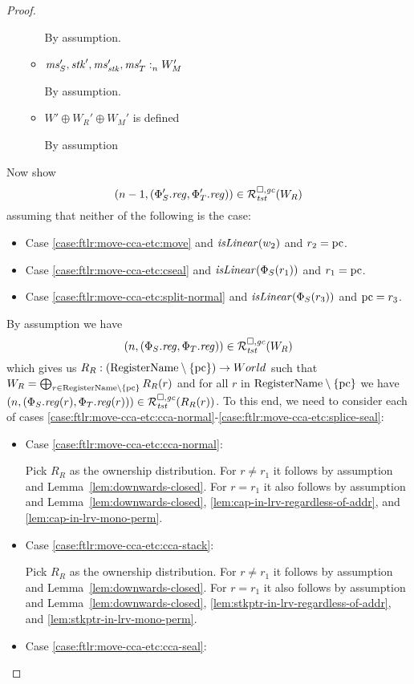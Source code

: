 \begin{proof}
\begin{itemize}
\begin{itemize}
      By assumption.
    \item $\mathit{ms}_S',\mathit{stk}',\mathit{ms}_{\mathit{stk}}',\mathit{ms}_T' :_{n}^{}W_M'$

      By assumption.

    \item $W' \oplus W_R' \oplus W_M'$ is defined

      By assumption
    \end{itemize}
  \end{itemize}
  
  Now show
  \[
    \npair[n-1]{(\Phi_S'.\reg,\Phi_T'.\reg)} \in \lrrg{\trust}(W_R)
  \]
  assuming that neither of the following is the case:
  \begin{itemize}
  \item Case \ref{case:ftlr:move-cca-etc:move} and $\isLinear{w_2}$ and $r_2 = \mathrm{pc}$.
  \item Case \ref{case:ftlr:move-cca-etc:cseal} and $\isLinear{\Phi_S(r_1)}$ and
    $r_1 = \mathrm{pc}$.
  \item Case \ref{case:ftlr:move-cca-etc:split-normal} and
    $\isLinear{\Phi_S(r_3)}$ and $\mathrm{pc} = r_3$.
  \end{itemize}

  By assumption we have
  \[
    \npair[n]{(\Phi_S.\reg,\Phi_T.\reg)} \in \lrrg{\trust}(W_R)
  \]
  which gives us $R_R : (\mathrm{RegisterName} \setminus \{\mathrm{pc}\}) \rightarrow World$ such that $W_R = \bigoplus_{r\in \mathrm{RegisterName} \setminus \{\mathrm{pc}\}} R_R(r)$ and for all $r$ in $\mathrm{RegisterName} \setminus \{\mathrm{pc}\}$ we have $\npair[n]{(\Phi_S.\reg(r),\Phi_T.\reg(r))} \in \lrrg{\trust}(R_R(r))$.
  To this end, we need to consider each of cases \ref{case:ftlr:move-cca-etc:cca-normal}-\ref{case:ftlr:move-cca-etc:splice-seal}:
  \begin{itemize}
  \item Case \ref{case:ftlr:move-cca-etc:cca-normal}:

    Pick $R_R$ as the ownership distribution.
    For $r \neq r_1$ it follows by assumption and Lemma~\ref{lem:downwards-closed}.
    For $r = r_1$ it also follows by assumption and Lemma~\ref{lem:downwards-closed}, \ref{lem:cap-in-lrv-regardless-of-addr}, and \ref{lem:cap-in-lrv-mono-perm}.
  \item Case \ref{case:ftlr:move-cca-etc:cca-stack}:

    Pick $R_R$ as the ownership distribution.
    For $r \neq r_1$ it follows by assumption and Lemma~\ref{lem:downwards-closed}.
    For $r = r_1$ it also follows by assumption and Lemma~\ref{lem:downwards-closed}, \ref{lem:stkptr-in-lrv-regardless-of-addr}, and \ref{lem:stkptr-in-lrv-mono-perm}.
  \item Case \ref{case:ftlr:move-cca-etc:cca-seal}:


\end{itemize}
\end{proof}
